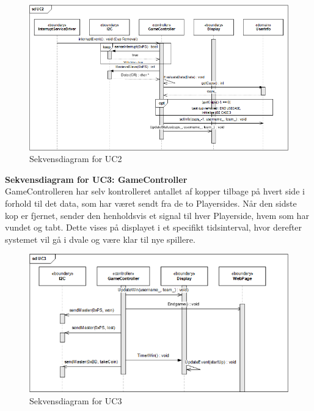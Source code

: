 \documentclass[Arkitektur/System_main.tex]{subfiles}
\begin{document}
\begin{figure}[H]
    \centering
    \includegraphics[width=\textwidth]{Arkitektur/Softwarearkitektur/Applikationsmodel/RPi/graphics_RPi/UC2_SD.png}
    \caption{Sekvensdiagram for UC2}
    \label{fig:UC2_SD_RPi}
\end{figure}

\newpage
\textbf{Sekvensdiagram for UC3: GameController}\\
GameControlleren har selv kontrolleret antallet af kopper tilbage på hvert side i forhold til det data, som har været sendt fra de to Playersides. Når den sidste kop er fjernet, sender den henholdsvis et signal til hver Playerside, hvem som har vundet og tabt. Dette vises på displayet i et specifikt tidsinterval, hvor derefter systemet vil gå i dvale og være klar til nye spillere. 

\begin{figure}[H]
    \centering
    \includegraphics[width=\textwidth]{Arkitektur/Softwarearkitektur/Applikationsmodel/RPi/graphics_RPi/UC3_SD.png}
   \caption{Sekvensdiagram for UC3}
    \label{fig:UC3_SD_RPi}
\end{figure}
\end{document}
